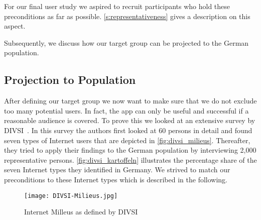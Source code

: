 For our final user study we aspired to recruit participants who hold these preconditions as far as possible.
\autoref{s:representativeness} gives a description on this aspect.

Subsequently, we discuss how our target group can be projected to the German population.

\subsection{Projection to Population}
After defining our target group we now want to make sure that we do not exclude too many potential users.
In fact, the app can only be useful and successful if a reasonable audience is covered.
To prove this we looked at an extensive survey by DIVSI~\cite{divsi2012divsi}.
In this survey the authors first looked at 60 persons in detail and found seven types of Internet users that are depicted in \autoref{fig:divsi_milieus}.
Thereafter, they tried to apply their findings to the German population by interviewing 2,000 representative persons.
\autoref{fig:divsi_kartoffeln} illustrates the percentage share of the seven Internet types they identified in Germany.
We strived to match our preconditions to these Internet types which is described in the following.

\begin{figure}[hHtbp]
\centering
\texttt{[image: DIVSI-Milieus.jpg]}
\caption{Internet Milleus as defined by DIVSI \cite{divsi2012divsi}}
\label{fig:divsi_milieus}
\end{figure}

